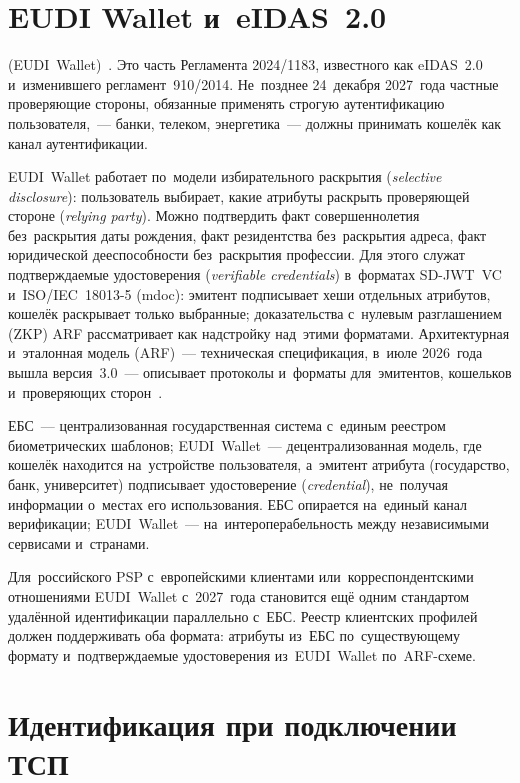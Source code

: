 \section{{EUDI} {Wallet} и~{eIDAS}~2.0}\label{sec:kyc-eudi-wallet}

(EUDI~Wallet)~\cite{eu-eidas-2-regulation}. Это часть Регламента 2024/1183,
известного как eIDAS~2.0 и~изменившего регламент~910/2014. Не~позднее
24~декабря 2027~года частные проверяющие стороны, обязанные применять строгую
аутентификацию пользователя,~--- банки, телеком, энергетика~--- должны принимать
кошелёк как канал аутентификации.

EUDI~Wallet работает по~модели избирательного раскрытия (\textit{selective
disclosure}): пользователь выбирает, какие атрибуты раскрыть проверяющей
стороне (\textit{relying party}). Можно подтвердить факт совершеннолетия
без~раскрытия даты рождения, факт резидентства без~раскрытия адреса, факт
юридической дееспособности без~раскрытия профессии. Для этого служат
подтверждаемые удостоверения (\textit{verifiable credentials})
в~форматах SD-JWT~VC и~ISO/IEC~18013-5 (mdoc): эмитент подписывает хеши
отдельных атрибутов, кошелёк раскрывает только выбранные; доказательства
с~нулевым разглашением (ZKP) ARF рассматривает как надстройку над~этими
форматами.
Архитектурная и~эталонная модель (ARF)~--- техническая спецификация,
в~июле 2026~года вышла версия~3.0~--- описывает протоколы и~форматы
для~эмитентов, кошельков и~проверяющих сторон~\cite{eudi-wallet-arf}.

ЕБС~--- централизованная государственная система с~единым реестром
биометрических шаблонов; EUDI~Wallet~--- децентрализованная модель, где кошелёк
находится на~устройстве пользователя, а~эмитент атрибута (государство, банк,
университет) подписывает удостоверение (\textit{credential}), не~получая
информации о~местах его использования. ЕБС опирается на~единый канал
верификации; EUDI~Wallet~--- на~интероперабельность между независимыми
сервисами и~странами.

Для~российского PSP с~европейскими клиентами или~корреспондентскими отношениями
EUDI~Wallet с~2027~года становится ещё одним стандартом удалённой идентификации
параллельно с~ЕБС. Реестр клиентских профилей должен поддерживать
оба формата: атрибуты из~ЕБС по~существующему формату и~подтверждаемые
удостоверения из~EUDI~Wallet по~ARF-схеме.

\section{Идентификация при подключении ТСП}\label{sec:kyb-merchants}


